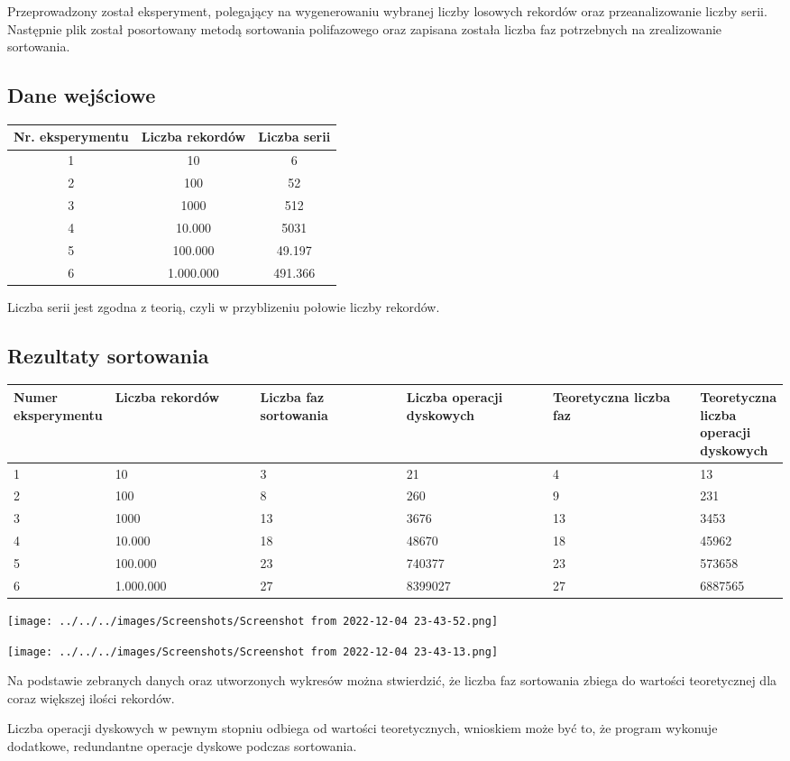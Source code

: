 \documentclass[11pt,a4paper]{article}
\begin{document}
Przeprowadzony został eksperyment, polegający na wygenerowaniu wybranej liczby losowych rekordów oraz przeanalizowanie liczby serii. Następnie plik został posortowany metodą sortowania polifazowego oraz zapisana została liczba faz potrzebnych na zrealizowanie sortowania.

\subsection{Dane wejściowe}

\begin{tabular}{|c|c|c|}
\hline 
Nr. eksperymentu & Liczba rekordów & Liczba serii \\ 
\hline 
1 & 10 & 6 \\ 
\hline 
2 & 100 & 52 \\ 
\hline 
3 & 1000 & 512 \\
\hline
4 & 10.000 & 5031 \\
\hline 
5 & 100.000 & 49.197 \\ 
\hline 
6 & 1.000.000 & 491.366 \\ 
\hline 
\end{tabular} 

Liczba serii jest zgodna z teorią, czyli w przyblizeniu połowie liczby rekordów.

\subsection{Rezultaty sortowania}

\begin{tabular}{|p{0.1\linewidth}|p{0.2\linewidth}|p{0.2\linewidth}|p{0.2\linewidth}|p{0.2\linewidth}|p{0.2\linewidth}|}
\hline 
Numer eksperymentu & Liczba rekordów & Liczba faz sortowania & Liczba operacji dyskowych & Teoretyczna liczba faz & Teoretyczna liczba operacji dyskowych \\ 
\hline 
1 & 10 & 3 & 21 & 4 & 13 \\ 
\hline 
2 & 100 & 8 & 260 & 9 & 231 \\ 
\hline 
3 & 1000 & 13 & 3676 & 13 & 3453 \\ 
\hline 
4 & 10.000 & 18 & 48670 & 18 & 45962 \\ 
\hline 
5 & 100.000 & 23 & 740377 & 23 & 573658 \\ 
\hline 
6 & 1.000.000 & 27 & 8399027 & 27 & 6887565 \\ 
\hline 
\end{tabular} 

\texttt{[image: ../../../images/Screenshots/Screenshot from 2022-12-04 23-43-52.png]} 

\texttt{[image: ../../../images/Screenshots/Screenshot from 2022-12-04 23-43-13.png]} 

Na podstawie zebranych danych oraz utworzonych wykresów można stwierdzić, że liczba faz sortowania zbiega do wartości teoretycznej dla coraz większej ilości rekordów. 

Liczba operacji dyskowych w pewnym stopniu odbiega od wartości teoretycznych, wnioskiem może być to, że program wykonuje dodatkowe, redundantne operacje dyskowe podczas sortowania.
\end{document}
